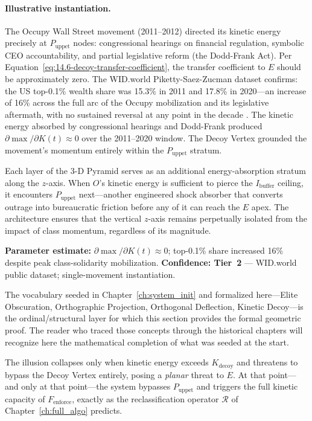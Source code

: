 \paragraph{Illustrative instantiation.}
The Occupy Wall Street movement (2011--2012) directed its kinetic energy precisely at $P_{\text{uppet}}$ nodes: congressional hearings on financial regulation, symbolic CEO accountability, and partial legislative reform (the Dodd-Frank Act). Per Equation~\eqref{eq:14.6-decoy-transfer-coefficient}, the transfer coefficient to $E$ should be approximately zero. The WID.world Piketty-Saez-Zucman dataset confirms: the US top-0.1\% wealth share was 15.3\% in 2011 and 17.8\% in 2020---an increase of 16\% across the full arc of the Occupy mobilization and its legislative aftermath, with no sustained reversal at any point in the decade \cite{piketty}. The kinetic energy absorbed by congressional hearings and Dodd-Frank produced $\partial\max / \partial K(t) \approx 0$ over the 2011--2020 window. The Decoy Vertex grounded the movement's momentum entirely within the $P_{\text{uppet}}$ stratum.

Each layer of the 3-D Pyramid serves as an additional energy-absorption stratum along the $z$-axis. When $O$'s kinetic energy is sufficient to pierce the $I_{\text{buffer}}$ ceiling, it encounters $P_{\text{uppet}}$ next---another engineered shock absorber that converts outrage into bureaucratic friction before any of it can reach the $E$ apex. The architecture ensures that the vertical $z$-axis remains perpetually isolated from the impact of class momentum, regardless of its magnitude.

\textbf{Parameter estimate:} $\partial\max / \partial K(t) \approx 0$; top-0.1\% share increased 16\% despite peak class-solidarity mobilization. \textbf{Confidence: Tier~2} --- WID.world public dataset; single-movement instantiation.

The vocabulary seeded in Chapter~\ref{ch:system_init} and formalized here---Elite
Obscuration, Orthographic Projection, Orthogonal Deflection, Kinetic Decoy---is
the ordinal/structural layer for which this section provides the formal geometric
proof. The reader who traced those concepts through the historical chapters will
recognize here the mathematical completion of what was seeded at the start.

The illusion collapses only when kinetic energy exceeds $K_{\text{decoy}}$ and threatens to bypass the Decoy Vertex entirely, posing a \textit{planar} threat to $E$. At that point---and only at that point---the system bypasses $P_{\text{uppet}}$ and triggers the full kinetic capacity of $F_{\text{enforce}}$, exactly as the reclassification operator $\mathcal{R}$ of Chapter~\ref{ch:full_algo} predicts.

